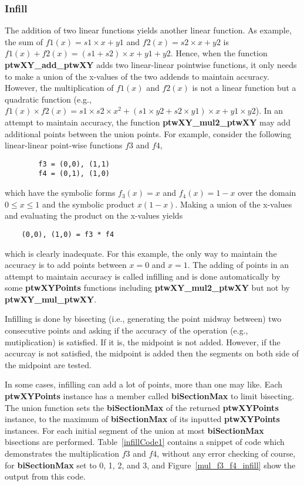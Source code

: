 \documentclass[11pt]{article}
\newcommand{\highlight}[1]{{\bf #1}}
\begin{document}
\subsubsection{Infill}
The addition of two linear functions yields another linear function. As example, the sum of $f1(x) = s1 \times x + y1$
and $f2(x) = s2 \times x + y2$ is $f1(x) + f2(x) = ( s1 + s2 ) \times x + y1 + y2$. Hence, when the function \highlight{ptwXY\_add\_ptwXY}
adds two linear-linear pointwise functions, it only needs to make a union of the x-values of the two addends to maintain accuracy.
However, the multiplication of $f1(x)$ and $f2(x)$ is not a linear function but a quadratic function (e.g., $ f1(x) \times f2(x) =
s1 \times s2 \times x^2 + ( s1 \times y2 + s2 \times y1 ) \times x + y1 \times y2$). In an attempt to maintain accuracy, the
function \highlight{ptwXY\_mul2\_ptwXY} may add additional points between the union points. For example, consider the following
linear-linear point-wise functions $f3$ and $f4$,
\begin{verbatim}
        f3 = (0,0), (1,1)
        f4 = (0,1), (1,0)
\end{verbatim}
which have the symbolic forms $f_3(x) = x$ and $f_4(x) = 1 - x$ over the domain $0 \le x \le 1$ and the symbolic
product $x ( 1 - x )$. Making a union of the x-values and evaluating the product on the x-values yields
\begin{verbatim}
    (0,0), (1,0) = f3 * f4
\end{verbatim}
which is clearly inadequate. For this example, the only way to maintain the accuracy is to add points between $x = 0$ and $x = 1$. The adding of
points in an attempt to maintain accuracy is called infilling and is done automatically by some \highlight{ptwXYPoints} functions
including \highlight{ptwXY\_mul2\_ptwXY} but not by \highlight{ptwXY\_mul\_ptwXY}.

Infilling is done by bisecting (i.e., generating the point midway between) two consecutive points and asking if 
the accuracy of the operation (e.g., mutiplication) is satisfied. If it is, the midpoint is not added. However, if 
the accurcay is not satisfied, the midpoint is added then the segments on both side of the midpoint are tested. 

In some cases, infilling can add a lot of points, more than one may like. Each \highlight{ptwXYPoints}
instance has a member called \highlight{biSectionMax} to limit bisecting. The union function sets the
\highlight{biSectionMax} of the returned \highlight{ptwXYPoints} instance, to the maximum of \highlight{biSectionMax} of
its inputted \highlight{ptwXYPoints} instances. For each initial segment of the union at most
\highlight{biSectionMax} bisections are performed. Table~\ref{infillCode1} contains a snippet of code which
demonstrates the multiplication $f3$ and $f4$, without any error checking of course, for \highlight{biSectionMax}
set to 0, 1, 2, and 3, and Figure~\ref{mul_f3_f4_infill} show the output from this code.
\end{document}
